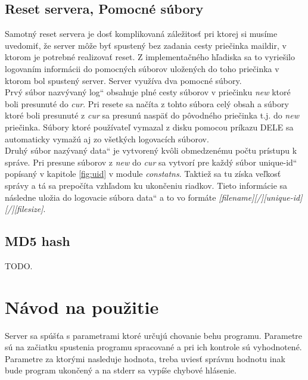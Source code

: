 \documentclass[11pt,a4paper]{article}
\providecommand{\uv}[1]{\quotedblbase #1\textquotedblleft}
\begin{document}
	\subsection{Reset servera, Pomocné súbory}
		\indent Samotný reset servera je dosť komplikovaná záležitosť pri ktorej si musíme uvedomiť, že server môže byť spustený bez zadania cesty priečinka maildir, v ktorom je potrebné realizovať reset. Z implementačného hľadiska sa to vyriešilo logovaním informácii do pomocných súborov uložených do toho priečinka v ktorom bol spustený server. Server využíva dva pomocné súbory.\\[0.4em]
		\indent Prvý súbor nazvývaný \uv{log} obsahuje plné cesty súborov v priečinku \textit{new} ktoré boli presunuté do \textit{cur}. Pri resete sa načíta z tohto súbora celý obsah a súbory ktoré boli presunuté z \textit{cur} sa presunú naspäť do pôvodného priečinka t.j. do \textit{new} priečinka. Súbory ktoré používateľ vymazal z disku pomocou príkazu DELE sa automaticky vymažú aj zo všetkých logovacích súborov.\\[0.4em]
		\indent Druhý súbor nazývaný \uv{data} je vytvorený kvôli obmedzenému počtu prístupu k správe. Pri presune súborov z \textit{new} do \textit{cur} sa vytvorí pre každý súbor \uv{unique-id} popísaný v kapitole \ref{fig:uid} v module \textit{constatns}. Taktiež sa tu získa veľkosť správy a tá sa prepočíta vzhľadom ku ukončeniu riadkov. Tieto informácie sa následne uložia do logovacie súbora \uv{data} a to vo formáte \textit{[filename][/][unique-id][/][filesize]}.

	\subsection{MD5 hash}
		\indent TODO.

\section{Návod na použitie}
	Server sa spúšťa s parametrami ktoré určujú chovanie behu programu. Parametre sú na začiatku spustenia programu spracované a pri ich kontrole sú vyhodnotené. Parametre za ktorými nasleduje hodnota, treba uviesť správnu hodnotu inak bude program ukončený a na stderr sa vypíše chybové hlásenie.\\
\end{document}
